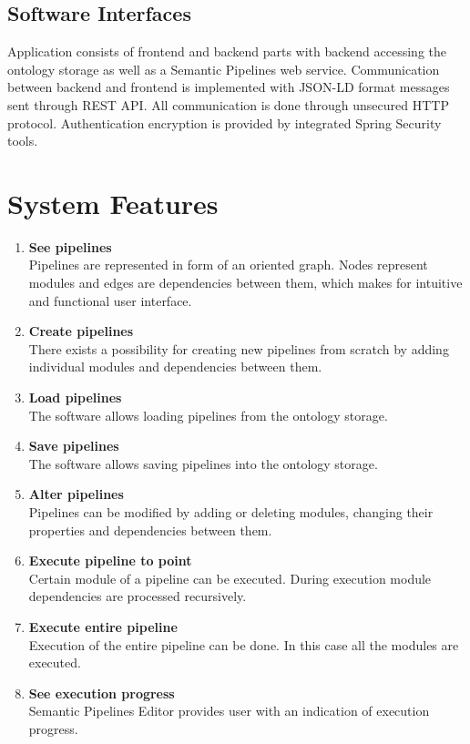 \documentclass{article}
\begin{document}
\subsection{Software Interfaces}
Application consists of frontend and backend parts with backend accessing the ontology storage as well as a Semantic Pipelines web service. Communication between backend and frontend is implemented with JSON-LD format messages sent through REST API. All communication is done through unsecured HTTP protocol. Authentication encryption is provided by integrated Spring Security tools. 
\section{System Features}
\label{sec:features}
\begin{enumerate}[FRQ1]
    \item \textbf{See pipelines}\\
	Pipelines are represented in form of an oriented graph. Nodes represent modules and edges are dependencies between them, which makes for intuitive and functional user interface.
    \item \textbf{Create pipelines}\\
	There exists a possibility for creating new pipelines from scratch by adding individual modules and dependencies between them.
    \item \textbf{Load pipelines}\\
	The software allows loading pipelines from the ontology storage.
    \item \textbf{Save pipelines}\\
	The software allows saving pipelines into the ontology storage.
    \item \textbf{Alter pipelines}\\
	Pipelines can be modified by adding or deleting modules, changing their properties and dependencies between them.
    \item \textbf{Execute pipeline to point}\\
	Certain module of a pipeline can be executed. During execution module dependencies are processed recursively.
    \item \textbf{Execute entire pipeline}\\
	Execution of the entire pipeline can be done. In this case all the modules are executed.
    \item \textbf{See execution progress}\\
	Semantic Pipelines Editor provides user with an indication of execution progress.

\end{enumerate}
\end{document}
